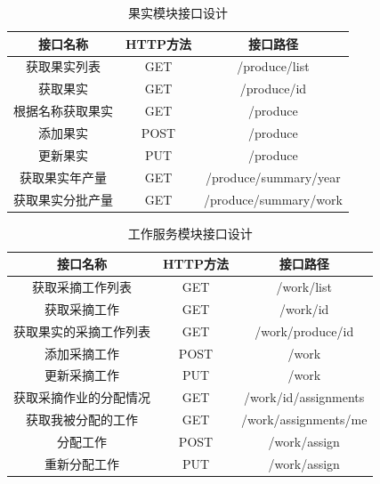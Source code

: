 \documentclass{xduugmr}
\begin{document}
\begin{table}[H]
\centering
\begin{tabular}{|c|c|c|}
\hline
\textbf{接口名称} & \textbf{HTTP方法} & \textbf{接口路径} \\
\hline
获取果实列表 & GET & /produce/list \\
\hline
获取果实 & GET & /produce/{id} \\
\hline
根据名称获取果实 & GET & /produce \\
\hline
添加果实 & POST & /produce \\
\hline
更新果实 & PUT & /produce \\
\hline
获取果实年产量 & GET & /produce/summary/year \\
\hline
获取果实分批产量 & GET & /produce/summary/work \\
\hline
\end{tabular}%

\caption{果实模块接口设计}
\label{tab:果实模块接口设计}
\end{table}

\begin{table}[H]
\centering
\begin{tabular}{|c|c|c|}
\hline
\textbf{接口名称} & \textbf{HTTP方法} & \textbf{接口路径} \\
\hline
获取采摘工作列表 & GET & /work/list \\
\hline
获取采摘工作 & GET & /work/{id} \\
\hline
获取果实的采摘工作列表 & GET & /work/produce/{id} \\
\hline
添加采摘工作 & POST & /work \\
\hline
更新采摘工作 & PUT & /work \\
\hline
获取采摘作业的分配情况 & GET & /work/{id}/assignments \\
\hline
获取我被分配的工作 & GET & /work/assignments/me \\
\hline
分配工作 & POST & /work/assign \\
\hline
重新分配工作 & PUT & /work/assign \\
\hline
\end{tabular}%

\caption{工作服务模块接口设计}
\label{tab:工作服务模块接口设计}
\end{table}
\end{document}
